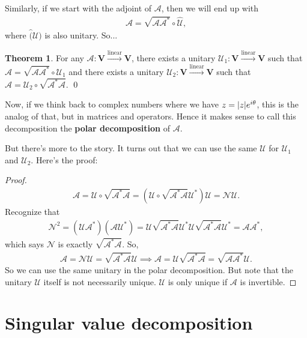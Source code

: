 \documentclass{book}
\theoremstyle{definition}
\newtheorem{thm}{Theorem}[section]
\newcommand{\Uni}{\mathcal{U}}
\newcommand{\V}{\mathbf{V}}
\newcommand{\A}{\mathcal{A}}
\newcommand{\N}{\mathcal{N}}
\newcommand{\lin}{\overset{\text{linear}}{\longrightarrow}}
\newcommand{\lp}{\left(}
\newcommand{\rp}{\right)}
\begin{document}
Similarly, if we start with the adjoint of $\A$, then we will end up with
\begin{align*}
\A = \sqrt{\A\A^*}\circ \hat{\Uni},
\end{align*}
where $\hat(\Uni)$ is also unitary. So...

\begin{thm}
	For any $\A : \V \lin \V$, there exists a unitary $\Uni_1: \V \lin \V$ such that $\A = \sqrt{\A\A^*} \circ \Uni_1$ and there exists a unitary $\Uni_2 : \V \lin \V$ such that $\A = \Uni_2 \circ \sqrt{\A^*\A}$. \qed
\end{thm}

Now, if we think back to complex numbers where we have $z = \abs{z}e^{i\theta}$, this is the analog of that, but in matrices and operators. Hence it makes sense to call this decomposition the \textbf{polar decomposition} of $\A$. 

But there's more to the story. It turns out that we can use the same $\Uni$ for $\Uni_1$ and $\Uni_2$. Here's the proof:
\begin{proof}
	\begin{align*}
	\A = \Uni \circ \sqrt{\A^*\A} = \lp \Uni \circ \sqrt{\A^*\A} \Uni^* \rp \Uni = \N \Uni.
	\end{align*}
	Recognize that
	\begin{align*}
	\N^2 = (\Uni \A^*)(\A \Uni^*) = \Uni \sqrt{\A^*\A} \Uni^*\Uni \sqrt{\A^*\A} \Uni^* =  \A \A^*,
	\end{align*}
	which says $\N$ is exactly $\sqrt{\A^*\A}$. So, 
	\begin{align*}
	\A = \N \Uni =  \sqrt{\A^*\A}\Uni \implies \A=  \Uni \sqrt{\A^*\A} = \sqrt{\A\A^*}\Uni.
	\end{align*}
	So we can use the same unitary in the polar decomposition. But note that the unitary $\Uni$ itself is not necessarily unique. $\Uni$ is only unique if $\A$ is invertible. 
\end{proof}









\newpage 

\chapter{Singular value decomposition}
\end{document}
